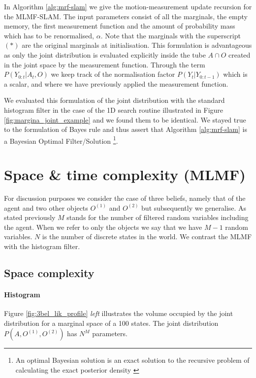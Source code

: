 In Algorithm \ref{alg:mrf-slam} we give the motion-measurement update recursion for the MLMF-SLAM. The input parameters consist 
of all the marginals, the empty memory, the first measurement function and the amount of probability mass which has to be renormalised, $\alpha$. 
Note that the marginals with the superscript $(*)$ are the original marginals at initialisation. 
This formulation is advantageous as only the joint distribution is evaluated explicitly inside the tube 
$A\cap O$ created in the joint space by the measurement function. Through the term $P(Y_{0:t}|A_t,O)$ we keep track of the normalisation factor $P(Y_t|Y_{0:t-1})$ which 
is a scalar, and where we have previously applied the measurement function. 

We evaluated this formulation of the joint distribution with the standard histogram filter in the case of the 1D search routine 
illustrated in Figure \ref{fig:margina_joint_example} and we found them to be identical. We stayed true to the formulation of Bayes rule 
and thus assert that Algorithm \ref{alg:mrf-slam} is a Bayesian Optimal Filter/Solution
\footnote{An optimal Bayesian solution is an exact solution to the recursive problem of calculating the exact posterior density 
\cite{PF_tutorial_2002}}.

\section{Space \& time complexity (MLMF)}\label{ch5:space_time_complexity_MLMF}

For discussion purposes we consider the case of three beliefs, namely that of the agent and two other objects $O^{(1)}$ and $O^{(2)}$ but 
subsequently we generalise. As stated previously $M$ stands for the number of filtered random variables including the agent. When we refer 
to only the objects we say that we have $M-1$ random variables. $N$ is the number of discrete states in the world. We contrast
the MLMF with the histogram filter.

\subsection{Space complexity}

\paragraph{Histogram}

Figure \ref{fig:3bel_lik_profile} \textit{left} illustrates the volume occupied by the joint distribution for a marginal space of a 
100 states. The joint distribution $P(A,O^{(1)},O^{(2)})$ has $N^{M}$ parameters. 

